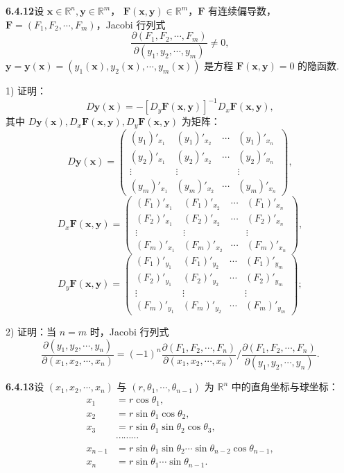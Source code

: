 \documentclass[UTF8, 12pt, fontset=fandol, oneside]{ctexart}
\begin{document}
\noindent\textbf{6.4.12}\quad 设 $\mathbf x\in\mathbb R^n,\mathbf y\in\mathbb R^m$，
$\mathbf F(\mathbf x,\mathbf y)\in\mathbb R^m$，$\mathbf F$ 有连续偏导数，
$\mathbf F=(F_1,F_2,\cdots,F_m)$，Jacobi 行列式
\[
  \frac{\partial(F_1,F_2,\cdots,F_m)}
       {\partial(y_1,y_2,\cdots,y_m)}\ne0,
\]
$\mathbf y=\mathbf y(\mathbf x)=(y_1(\mathbf x),y_2(\mathbf x),\cdots,y_m(\mathbf x))$
是方程 $\mathbf F(\mathbf x,\mathbf y)=0$ 的隐函数.

1) 证明：
\[
  D\mathbf y(\mathbf x)=-[D_y\mathbf F(\mathbf x,\mathbf y)]^{-1}D_x\mathbf F(\mathbf x,\mathbf y),
\]
其中 $D\mathbf y(\mathbf x),D_x\mathbf F(\mathbf x,\mathbf y),D_y\mathbf F(\mathbf x,\mathbf y)$ 为矩阵：
\[
D\mathbf y(\mathbf x)=
\begin{pmatrix}
  (y_1)'_{x_1} & (y_1)'_{x_2} & \cdots & (y_1)'_{x_n}\\
  (y_2)'_{x_1} & (y_2)'_{x_2} & \cdots & (y_2)'_{x_n}\\
  \vdots & \vdots & & \vdots\\
  (y_m)'_{x_1} & (y_m)'_{x_2} & \cdots & (y_m)'_{x_n}
\end{pmatrix},
\]
\[
D_x\mathbf F(\mathbf x,\mathbf y)=
\begin{pmatrix}
  (F_1)'_{x_1} & (F_1)'_{x_2} & \cdots & (F_1)'_{x_n}\\
  (F_2)'_{x_1} & (F_2)'_{x_2} & \cdots & (F_2)'_{x_n}\\
  \vdots & \vdots & & \vdots\\
  (F_m)'_{x_1} & (F_m)'_{x_2} & \cdots & (F_m)'_{x_n}
\end{pmatrix},
\]
\[
D_y\mathbf F(\mathbf x,\mathbf y)=
\begin{pmatrix}
  (F_1)'_{y_1} & (F_1)'_{y_2} & \cdots & (F_1)'_{y_m}\\
  (F_2)'_{y_1} & (F_2)'_{y_2} & \cdots & (F_2)'_{y_m}\\
  \vdots & \vdots & & \vdots\\
  (F_m)'_{y_1} & (F_m)'_{y_2} & \cdots & (F_m)'_{y_m}
\end{pmatrix};
\]

2) 证明：当 $n=m$ 时，Jacobi 行列式
\[
  \frac{\partial(y_1,y_2,\cdots,y_n)}
       {\partial(x_1,x_2,\cdots,x_n)}
  =
  (-1)^n
  \frac{\partial(F_1,F_2,\cdots,F_n)}
       {\partial(x_1,x_2,\cdots,x_n)}
  \bigg/
  \frac{\partial(F_1,F_2,\cdots,F_n)}
       {\partial(y_1,y_2,\cdots,y_n)}.
\]

\noindent\textbf{6.4.13}\quad 设 $(x_1,x_2,\cdots,x_n)$ 与
$(r,\theta_1,\cdots,\theta_{n-1})$ 为 $\mathbb R^n$ 中的直角坐标与球坐标：
\[
\begin{aligned}
  x_1&=r\cos\theta_1,\\
  x_2&=r\sin\theta_1\cos\theta_2,\\
  x_3&=r\sin\theta_1\sin\theta_2\cos\theta_3,\\
  &\cdots\cdots\cdots\\
  x_{n-1}&=r\sin\theta_1\sin\theta_2\cdots\sin\theta_{n-2}\cos\theta_{n-1},\\
  x_n&=r\sin\theta_1\cdots\sin\theta_{n-1}.
\end{aligned}
\]
\end{document}
